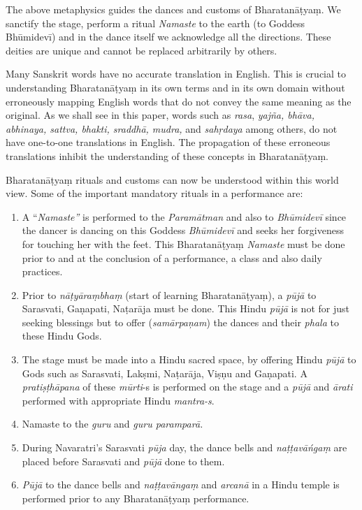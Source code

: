 The above metaphysics guides the dances and customs of Bharata\-nāṭyaṃ. We sanctify the stage, perform a ritual \textit{Namaste} to the earth (to Goddess Bhūmidevī) and in the dance itself we acknowledge all the directions. These deities are unique and cannot be replaced arbitrarily by others.

Many Sanskrit words have no accurate translation in English. This is crucial to understanding Bharatanāṭyaṃ in its own terms and in its own domain without erroneously mapping English words that do not convey the same meaning as the original. As we shall see in this paper, words such as \textit{rasa}, \textit{yajña, bhāva, abhinaya, sattva, bhakti, sraddhā, mudra,} and \textit{sahṛdaya} among others, do not have one-to-one translations in English. The propagation of these erroneous translations inhibit the understanding of these concepts in Bharatanāṭyaṃ.

Bharatanāṭyaṃ rituals and customs can now be understood within this world view. Some of the important mandatory rituals in a performance are:

\begin{enumerate}[{\rm 1)}]
\itemsep=0pt
\item A “\textit{Namaste”} is performed to the \textit{Paramātman }and also to \textit{Bhūmidevī} since the dancer is dancing on this Goddess \textit{Bhūmidevī} and seeks her forgiveness for touching her with the feet. This Bharatanāṭyaṃ \textit{Namaste }must be done prior to and at the conclusion of a performance, a class and also daily practices.

 \item Prior to \textit{nāṭyāraṃbhaṃ }(start of learning Bharatanāṭyaṃ), a \textit{pūjā }to Sarasvati, Gaṇapati, Naṭarāja must be done. This Hindu \textit{pūjā }is not for just seeking blessings but to offer (\textit{samārpaņam}) the dances and their \textit{phala }to these Hindu Gods.

 \item The stage must be made into a Hindu sacred space, by offering Hindu \textit{pūjā }to Gods such as Sarasvati, Lakṣmi, Naṭarāja, Viṣṇu and Gaṇapati. A \textit{pratiṣṭhāpana }of these \textit{mūrti}-s is performed on the stage and a \textit{pūjā }and \textit{ārati} performed with appropriate Hindu \textit{mantra-s}.

 \item Namaste to the \textit{guru} and \textit{guru paramparā.}

 \item During Navaratri’s Sarasvati \textit{pūja} day, the dance bells and \textit{naṭṭavāńgaṃ} are placed before Sarasvati and \textit{pūjā }done to them.

 \item \textit{Pūjā} to the dance bells and \textit{naṭṭavāngaṃ} and \textit{arcanā} in a Hindu temple is performed prior to any Bharatanāṭyaṃ performance.

\end{enumerate}


